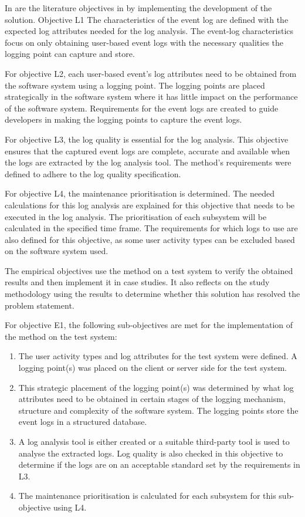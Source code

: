 In  are the literature objectives in  by implementing the development of the solution. Objective L1 The characteristics of the event log are defined with the expected log attributes needed for the log analysis. The event-log characteristics focus on only obtaining user-based event logs with the necessary qualities the logging point can capture and store.\par For objective L2, each user-based event's log attributes need to be obtained from the software system using a logging point. The logging points are placed strategically in the software system where it has little impact on the performance of the software system. Requirements for the event logs are created to guide developers in making the logging points to capture the event logs.\par For objective L3, the log quality is essential for the log analysis. This objective ensures that the captured event logs are complete, accurate and available when the logs are extracted by the log analysis tool. The method's requirements were defined to adhere to the log quality specification.\par For objective L4, the maintenance prioritisation is determined. The needed calculations for this log analysis are explained for this objective that needs to be executed in the log analysis. The prioritisation of each subsystem will be calculated in the specified time frame. The requirements for which logs to use are also defined for this objective, as some user activity types can be excluded based on the software system used.\par The empirical objectives use the method on a test system to verify the obtained results and then implement it in case studies. It also reflects on the study methodology using the results to determine whether this solution has resolved the problem statement.\par For objective E1, the following sub-objectives are met for the implementation of the method on the test system:

\begin{enumerate}
	\item The user activity types and log attributes for the test system were defined. A logging point(s) was placed on the client or server side for the test system.
	\item This strategic placement of the logging point(s) was determined by what log attributes need to be obtained in certain stages of the logging mechanism, structure and complexity of the software system. The logging points store the event logs in a structured database.
	\item A log analysis tool is either created or a suitable third-party tool is used to analyse the extracted logs. Log quality is also checked in this objective to determine if the logs are on an acceptable standard set by the requirements in L3. 
	\item The maintenance prioritisation is calculated for each subsystem for this sub-objective using L4.
\end{enumerate} 

